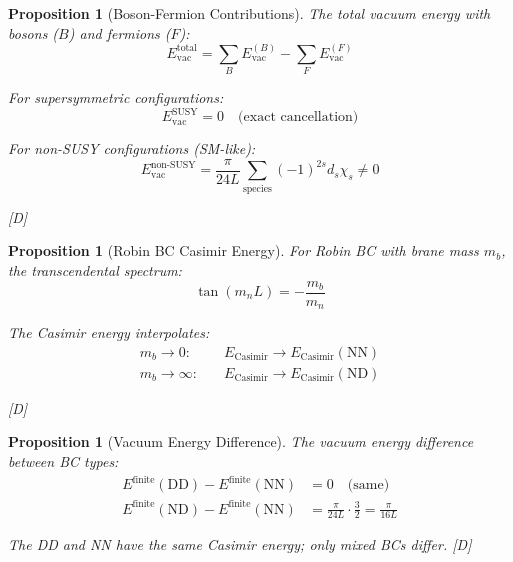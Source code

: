 \documentclass[11pt,a4paper]{article}
\newtheorem{proposition}[theorem]{Proposition}
\newcommand{\tagD}{\textcolor{blue!70!black}{[D]}}
\begin{document}
\begin{proposition}[Boson-Fermion Contributions]
\label{prop:bf-contrib}
The total vacuum energy with bosons ($B$) and fermions ($F$):
\begin{equation}
\label{eq:bf-total}
E_{\text{vac}}^{\text{total}} = \sum_B E_{\text{vac}}^{(B)} - \sum_F E_{\text{vac}}^{(F)}
\end{equation}

For supersymmetric configurations:
\begin{equation}
\label{eq:susy-cancel}
E_{\text{vac}}^{\text{SUSY}} = 0 \quad \text{(exact cancellation)}
\end{equation}

For non-SUSY configurations (SM-like):
\begin{equation}
\label{eq:non-susy}
E_{\text{vac}}^{\text{non-SUSY}} = \frac{\pi}{24L} \sum_{\text{species}} (-1)^{2s} d_s \chi_s \neq 0
\end{equation}

\tagD
\end{proposition}

\begin{proposition}[Robin BC Casimir Energy]
\label{prop:robin-casimir}
For Robin BC with brane mass $m_b$, the transcendental spectrum:
\begin{equation}
\label{eq:robin-transcend}
\tan(m_n L) = -\frac{m_b}{m_n}
\end{equation}

The Casimir energy interpolates:
\begin{align}
\label{eq:robin-limit-0}
m_b \to 0: \quad & E_{\text{Casimir}} \to E_{\text{Casimir}}(\text{NN}) \\
\label{eq:robin-limit-inf}
m_b \to \infty: \quad & E_{\text{Casimir}} \to E_{\text{Casimir}}(\text{ND})
\end{align}

\tagD
\end{proposition}

\begin{proposition}[Vacuum Energy Difference]
\label{prop:vac-diff}
The vacuum energy difference between BC types:
\begin{align}
\label{eq:diff-DD-NN}
E^{\text{finite}}(\text{DD}) - E^{\text{finite}}(\text{NN}) &= 0 \quad \text{(same)} \\
\label{eq:diff-ND-NN}
E^{\text{finite}}(\text{ND}) - E^{\text{finite}}(\text{NN}) &= \frac{\pi}{24L} \cdot \frac{3}{2} = \frac{\pi}{16L}
\end{align}

The DD and NN have the same Casimir energy; only mixed BCs differ. \tagD
\end{proposition}
\end{document}
